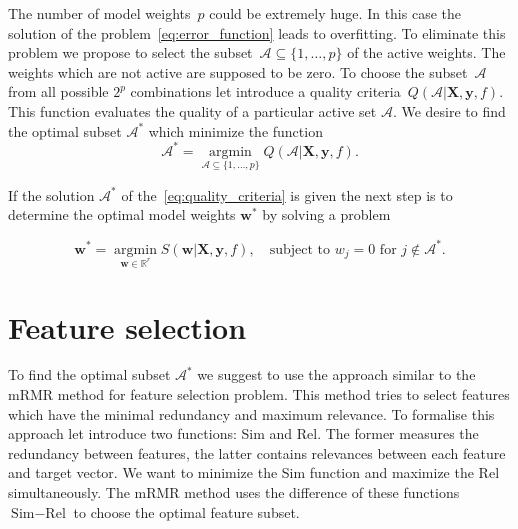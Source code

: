 \documentclass[a4paper,12pt]{article}
\theoremstyle{plain} %
\theoremstyle{definition} %
\theoremstyle{remark} %
\newcommand{\bw}{\mathbf{w}}
\newcommand{\by}{\mathbf{y}}
\newcommand{\bX}{\mathbf{X}}
\newcommand{\cA}{\mathcal{A}}
\newcommand{\bbR}{\mathbb{R}}
\newcommand{\argmin}{\mathop{\arg \min}\limits}
\begin{document}
	The number of model weights~$p$ could be extremely huge. 
	In this case the solution of the problem~\ref{eq:error_function} leads to overfitting. 
	To eliminate this problem we propose to select the subset~$\cA \subseteq \{1, \dots, p\}$ of the active weights. 
	The weights which are not active are supposed to be zero.
	To choose the subset~$\cA$ from all possible $2^p$ combinations let introduce a quality criteria~$Q(\cA | \bX, \by, f)$. 
	This function evaluates the quality of a particular active set $\cA$. 
	We desire to find the optimal subset $\cA^*$ which minimize the function
	\begin{equation}
		\cA^* = \argmin_{\cA \subseteq \{1, \dots, p\}} Q(\cA | \bX, \by, f).
		\label{eq:quality_criteria}
	\end{equation}
	
	If the solution $\cA^*$ of the~\ref{eq:quality_criteria} is given the next step is to determine the optimal model weights	$\bw^*$ by solving a problem
	
	\begin{equation}
		\bw^* = \argmin_{\bw \in \bbR^r} S(\bw | \bX, \by, f), \quad \text{subject to } w_j = 0 \text{ for } j \notin \cA^*.
		\label{eq:reduced_error_function}
	\end{equation}
	
	\section*{Feature selection}
	
	To find the optimal subset $\cA^*$ we suggest to use the approach similar to the mRMR method for feature selection problem. 
	This method tries to select features which have the minimal redundancy and maximum relevance.
	To formalise this approach let introduce two functions: Sim and Rel. 
	The former measures the redundancy between features, the latter contains relevances between each feature and target vector. 
	We want to minimize the Sim function and maximize the Rel simultaneously.
	The mRMR method uses the difference of these functions
	$\text{Sim} -\text{Rel}$ to choose the optimal feature subset.
	
\end{document}

